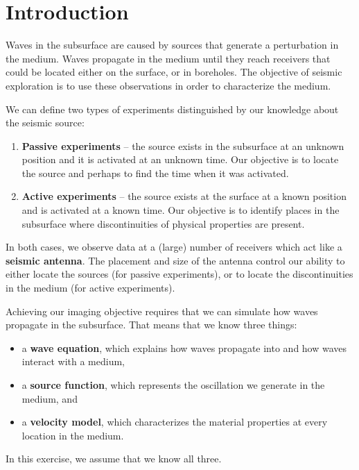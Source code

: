 \section{Introduction}

Waves in the subsurface are caused by sources that generate a perturbation in the medium. Waves propagate in the medium until they reach receivers that could be located either on the surface, or in boreholes. The objective of seismic exploration is to use these observations in order to characterize the medium.

We can define two types of experiments distinguished by our knowledge about the seismic source:
\begin{enumerate}
\item \textbf{Passive experiments} -- the source exists in the subsurface at an unknown position and it is activated at an unknown time. Our objective is to locate the source and perhaps to find the time when it was activated. 
\item \textbf{Active experiments} -- the source exists at the surface at a known position and is activated at a known time. Our objective is to identify places in the subsurface where discontinuities of physical properties are present.
\end{enumerate}
In both cases, we observe data at a (large) number of receivers which act like a \textbf{seismic antenna}. The placement and size of the antenna control our ability to either locate the sources (for passive experiments), or to locate the discontinuities in the medium (for active experiments).

Achieving our imaging objective requires that we can simulate how waves propagate in the subsurface. That means that we know three things:
\begin{itemize}
\item a \textbf{wave equation}, which explains how waves propagate into and how waves interact with a medium, 
\item a \textbf{source function}, which represents the oscillation we generate in the medium, and
\item a \textbf{velocity model}, which characterizes the material properties at every location in the medium.
\end{itemize}
In this exercise, we assume that we know all three.

